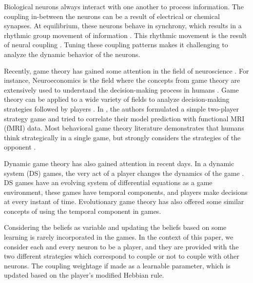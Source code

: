 \documentclass{article}
\begin{document}
Biological neurons always interact with one another to process information. The coupling in-between the neurons can be a result of electrical or chemical synapses. At equilibrium, these neurons behave in synchrony, which results in a rhythmic group movement of information \cite{varela2001brainweb, golomb1994clustering}. This rhythmic movement is the result of neural coupling \cite{varela2001brainweb}. Tuning these coupling patterns makes it challenging to analyze the dynamic behavior of the neurons.

Recently, game theory has gained some attention in the field of neuroscience \cite{schuster2010application}. For instance, Neuroeconomics is the field where the concepts from game theory are extensively used to understand the decision-making process in humans \cite{loewenstein2008neuroeconomics}. Game theory can be applied to a wide variety of fields to analyze decision-making strategies followed by players \cite{srivastava2005using}. In \cite{hampton2008neural}, the authors formulated a simple two-player strategy game and tried to correlate their model prediction with functional MRI (fMRI) data. Most behavioral game theory literature demonstrates that humans think strategically in a single game, but strongly considers the strategies of the opponent \cite{costa2001cognition}. 

Dynamic game theory has also gained attention in recent days. In a dynamic system (DS) games, the very act of a player changes the dynamics of the game \cite{akiyama2000dynamical}. DS games have an evolving system of differential equations as a game environment, these games have temporal components, and players make decisions at every instant of time. Evolutionary game theory \cite{dawkins1983john} has also offered some similar concepts of using the temporal component in games.

Considering the beliefs as variable and updating the beliefs based on some learning is rarely incorporated in the games. In the context of this paper, we consider each and every neuron to be a player, and they are provided with the two different strategies which correspond to couple or not to couple with other neurons. The coupling weightage if made as a learnable parameter, which is updated based on the player's modified Hebbian rule.
\end{document}
